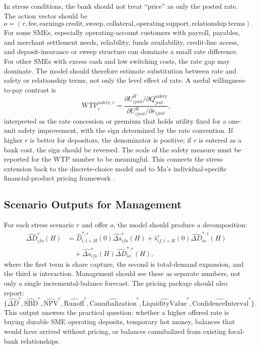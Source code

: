 \documentclass[11pt]{article}
\begin{document}
In stress conditions, the bank should not treat ``price'' as only the posted
rate. The action vector should be
\[
  o
  =
  (r,\mathrm{fee},\mathrm{earnings\ credit},
  \mathrm{sweep},\mathrm{collateral},\mathrm{operating\ support},
  \mathrm{relationship\ terms}).
\]
For some SMEs, especially operating-account customers with payroll, payables,
and merchant settlement needs, reliability, funds availability, credit-line
access, and deposit-insurance or sweep structure can dominate a small rate
difference. For other SMEs with excess cash and low switching costs, the rate
gap may dominate. The model should therefore estimate substitution between
rate and safety or relationship terms, not only the level effect of rate.
A useful willingness-to-pay contrast is
\[
  \mathrm{WTP}_{i}^{\mathrm{safety},r}
  =
  \frac{
    \partial U_{ijmt}^{R}/\partial Q_{jmt}^{\mathrm{safety}}}
       {\partial U_{ijmt}^{R}/\partial r_{ijmt}},
\]
interpreted as the rate concession or premium that holds utility fixed for a
one-unit safety improvement, with the sign determined by the rate convention.
If higher $r$ is better for depositors, the denominator is positive; if $r$ is
entered as a bank cost, the sign should be reversed. The scale of the safety
measure must be reported for the WTP number to be meaningful.
This connects the stress extension back to the discrete-choice model and to
Ma's individual-specific financial-product pricing framework
\citep{ma2024discrete}.

\subsection{Scenario Outputs for Management}

For each stress scenario $r$ and offer $o$, the model should produce a
decomposition:
\[
\begin{aligned}
  \widehat{\Delta D}_{ifo}^{r}(H)
  &=
  \widehat{D}_{i,t+H}^{*,r}(0)\widehat{\Delta s}_{ifo}^{r}(H)
  +\widehat{s}_{if,t+H}^{r}(0)\widehat{\Delta D}_{io}^{*,r}(H) \\
  &\quad
  +\widehat{\Delta s}_{ifo}^{r}(H)
   \widehat{\Delta D}_{io}^{*,r}(H),
\end{aligned}
\]
where the first term is share capture, the second is total-demand expansion,
and the third is interaction. Management should see these as separate numbers,
not only a single incremental-balance forecast. The pricing package should also
report:
\[
  \{\widehat{\Delta D}^{r},\widehat{\mathrm{SBD}}^{r},
  \widehat{\mathrm{NPV}}^{r},
  \widehat{\mathrm{Runoff}}^{r},
  \widehat{\mathrm{Cannibalization}}^{r},
  \widehat{\mathrm{LiquidityValue}}^{r},
  \widehat{\mathrm{ConfidenceInterval}}^{r}\}.
\]
This output answers the practical question: whether a higher offered rate is
buying durable SME operating deposits, temporary hot money, balances that would
have arrived without pricing, or balances cannibalized from existing focal-bank
relationships.
\end{document}
